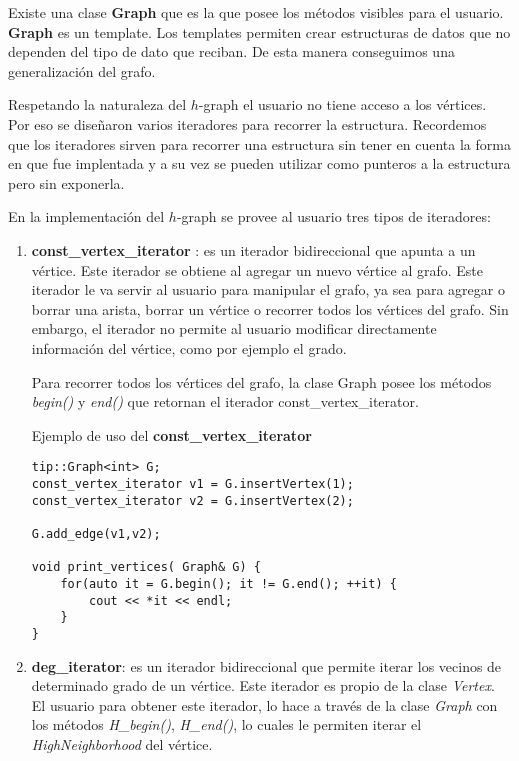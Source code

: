 \documentclass[a4paper,12pt]{article}
\begin{document}
Existe una clase \textbf{Graph} que es la que posee los métodos visibles para el usuario.
\textbf{Graph} es un template. Los templates permiten crear estructuras de datos que no dependen del tipo de dato que reciban. De esta manera conseguimos una generalización del grafo.

Respetando la naturaleza del $h$-graph el usuario no tiene acceso a los vértices. Por eso se diseñaron varios iteradores para recorrer la estructura.
Recordemos que los iteradores sirven para recorrer una estructura sin tener en cuenta la forma en que fue implentada y a su vez se pueden utilizar como punteros a la estructura pero sin exponerla.

En la implementación del $h$-graph se provee al usuario tres tipos de iteradores:

\begin{enumerate}
\item  \textbf{const\_vertex\_iterator} : es un iterador bidireccional que apunta a un vértice. Este iterador se obtiene al agregar un nuevo vértice al grafo. Este iterador le va servir al usuario para manipular el grafo, ya sea para agregar o borrar una arista, borrar un vértice o recorrer todos los vértices del grafo. Sin embargo, el iterador no permite al usuario modificar directamente información del vértice, como por ejemplo el grado.

Para recorrer todos los vértices del grafo, la clase Graph posee los métodos \textit{begin()} y \textit{end()} que retornan el iterador const\_vertex\_iterator.

Ejemplo de uso del \textbf{const\_vertex\_iterator}

\begin{lstlisting}[frame=single]
tip::Graph<int> G;
const_vertex_iterator v1 = G.insertVertex(1);
const_vertex_iterator v2 = G.insertVertex(2);

G.add_edge(v1,v2);

void print_vertices( Graph& G) {
    for(auto it = G.begin(); it != G.end(); ++it) {
        cout << *it << endl;
    }
}
\end{lstlisting}

\item \textbf{deg\_iterator}: es un iterador bidireccional que permite iterar los vecinos de determinado grado de un vértice. Este iterador es propio de la clase \textit{Vertex}. El usuario para obtener este iterador, lo hace a través de la clase \textit{Graph} con los métodos 
\textit{H\_begin()}, \textit{H\_end()}, lo cuales le permiten iterar el \textit{HighNeighborhood} del vértice.


\end{enumerate}
\end{document}

